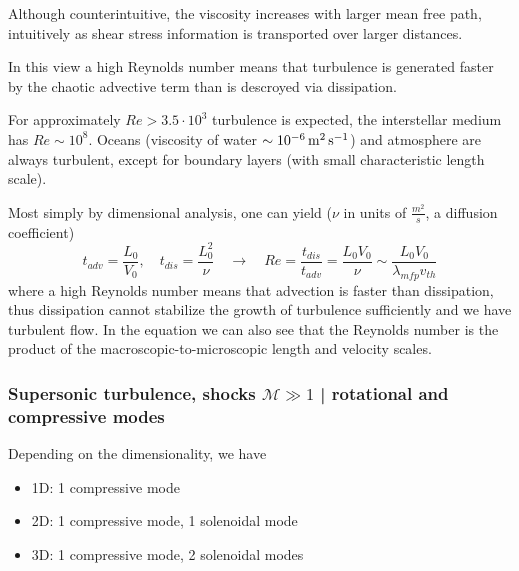 Although counterintuitive, the viscosity increases with larger mean free path, intuitively as shear stress information is transported
over larger distances.

In this view a high Reynolds number means that turbulence is generated faster by the chaotic advective term than is descroyed via dissipation.

\begin{mdframed}[style=padded]
    For approximately $Re > 3.5 \cdot 10^3$ turbulence is expected, the interstellar medium has $Re \sim 10^{8}$. Oceans (viscosity of water $\sim 10^{-6} \operatorname{m}^2 \operatorname{s}^{-1}$) and atmosphere are always turbulent, except for boundary layers (with small characteristic length scale).
\end{mdframed}

Most simply by dimensional analysis, one can yield ($\nu$ in units of $\frac{m^2}{s}$, a diffusion coefficient)
\begin{equation}
    t_{adv} = \frac{L_0}{V_0}, \quad t_{dis} = \frac{L_0^2}{\nu} \quad \rightarrow \quad Re = \frac{t_{dis}}{t_{adv}} = \frac{L_0 V_0}{\nu} \sim \frac{L_0 V_0}{\lambda_{mfp} v_{th}}
\end{equation}
where a high Reynolds number means that advection is faster than dissipation, thus dissipation cannot stabilize
the growth of turbulence sufficiently and we have turbulent flow. In the equation we can also see that the Reynolds number
is the product of the macroscopic-to-microscopic length and velocity scales.

\subsubsection{Supersonic turbulence, shocks $\mathcal{M} \gg 1$ | rotational and compressive modes}
Depending on the dimensionality, we have
\begin{itemize}
    \item 1D: 1 compressive mode
    \item 2D: 1 compressive mode, 1 solenoidal mode
    \item 3D: 1 compressive mode, 2 solenoidal modes
\end{itemize}

